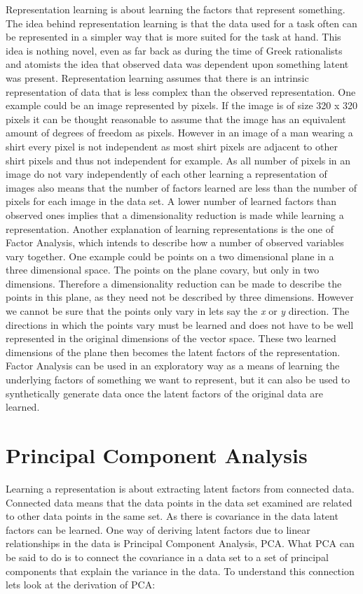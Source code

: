 \documentclass[a4paper,11pt]{kth-mag}
\begin{document}
Representation learning is about learning the factors that represent something. The idea behind representation learning is that the data used for a task often can be represented in a simpler way that is more suited for the task at hand\cite{bengio2013representation}. This idea is nothing novel, even as far back as during the time of Greek rationalists and atomists the idea that observed data was dependent upon something latent was present\cite{mulaik1987brief}. Representation learning assumes that there is an intrinsic representation of data that is less complex than the observed representation. One example could be an image represented by pixels. If the image is of size 320 x 320 pixels it can be thought reasonable to assume that the image has an equivalent amount of degrees of freedom as pixels. However in an image of a man wearing a shirt every pixel is not independent as most shirt pixels are adjacent to other shirt pixels and thus not independent for example. As all number of pixels in an image do not vary independently of each other learning a representation of images also means that the number of factors learned are less than the number of pixels for each image in the data set. A lower number of learned factors than observed ones implies that a dimensionality reduction is made while learning a representation. 
Another explanation of learning representations is the one of Factor Analysis, which intends to describe how a number of observed variables vary together. One example could be points on a two dimensional plane in a three dimensional space. The points on the plane covary, but only in two dimensions. Therefore a dimensionality reduction can be made to describe the points in this plane, as they need not be described by three dimensions. However we cannot be sure that the points only vary in lets say the \textit{x} or \textit{y} direction. The directions in which the points vary must be learned and does not have to be well represented in the original dimensions of the vector space. These two learned dimensions of the plane then becomes the latent factors of the representation.
Factor Analysis can be used in an exploratory way as a means of learning the underlying factors of something we want to represent, but it can also be used to synthetically generate data once the latent factors of the original data are learned.

\section{Principal Component Analysis} 
Learning a representation is about extracting latent factors from connected data. Connected data means that the data points in the data set examined are related to other data points in the same set. As there is covariance in the data latent factors can be learned. One way of deriving latent factors due to linear relationships in the data is Principal Component Analysis, PCA. What PCA can be said to do is to connect the covariance in a data set to a set of principal components that explain the variance in the data. To understand this connection lets look at the derivation of PCA:
\end{document}
